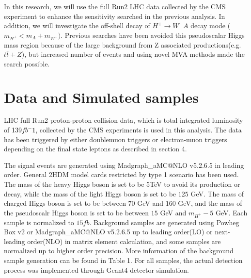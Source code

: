 \documentclass[
12pt, %
a4paper, %
oneside, %
headinclude,footinclude, %
BCOR5mm, %
]{scrartcl}
\begin{document}
In this research, we will use the full Run2 LHC data collected by the CMS experiment
to enhance the sensitivity searched in the previous analysis.
In addition, we will investigate the off-shell decay of $H^+ \rightarrow W^+A$ decay mode 
($m_{H^+} < m_A + m_{W^+})$. Previous searches have been avoided this 
pseudoscalar Higgs mass region because of the large background from Z associated productions(e.g. $t\bar{t}+Z$),
but increased number of events and using novel MVA methods made the search possible.

\section{Data and Simulated samples}
LHC full Run2 proton-proton collision data, which is total integrated luminosity of 139$fb^-1$, 
collected by the CMS experiments is used in this analysis.
The data has been triggered by either doublemuon triggers or electron-muon triggers depending on
the final state leptons as described in section 4.

The signal events are generated using Madgraph\_aMC@NLO v5.2.6.5 in leading order. 
General 2HDM model cards restricted by type 1 scenario has been used. 
The mass of the heavy Higgs boson is set to be 5TeV to avoid its production or decay, 
while the mass of the light Higgs boson is set to be $125$ GeV.
The mass of charged Higgs boson is set to be between $70$ GeV and $160$ GeV, 
and the mass of the pseudoscalr Higgs boson is set to be between $15$ GeV and $m_{H^+} - 5$ GeV. 
Each sample is normalized to $15fb$.
Background samples are generated using Powheg Box v2 or Madgraph\_aMC@NLO v5.2.6.5 
up to leading order(LO) or next-leading order(NLO) in matrix element calculation, 
and some samples are normalized up to higher order precision.
More information of the background sample generation can be found in Table 1.
For all samples, the actual detection process was implemented through Geant4 detector simulation.
\end{document}
